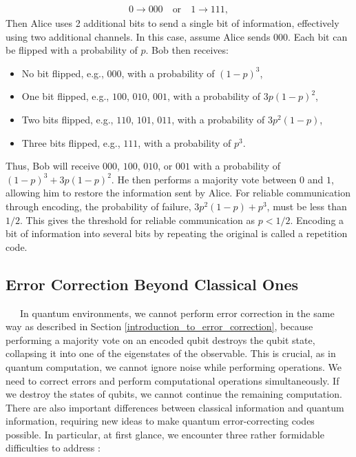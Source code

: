 \documentclass[a4paper,11pt]{ltjsarticle}
\begin{document}
{{        \begin{align}
            0 \rightarrow 000 \quad \text{or} \quad 1 \rightarrow 111,
        \end{align}      
        Then Alice uses 2 additional bits to send a single bit of information, effectively using two additional channels. In this case, assume Alice sends $000$. Each bit can be flipped with a probability of $p$. Bob then receives:
        \begin{itemize}
            \item No bit flipped, e.g., $000$, with a probability of $(1-p)^3$,
            \item One bit flipped, e.g., $100$, $010$, $001$, with a probability of $3p(1-p)^2$,
            \item Two bits flipped, e.g., $110$, $101$, $011$, with a probability of $3p^2(1-p)$,
            \item Three bits flipped, e.g., $111$, with a probability of $p^3$.
        \end{itemize}
        Thus, Bob will receive $000$, $100$, $010$, or $001$ with a probability of $(1-p)^3 + 3p(1-p)^2$. He then performs a majority vote between $0$ and $1$, allowing him to restore the information sent by Alice. For reliable communication through encoding, the probability of failure, $3p^2(1-p) + p^3$, must be less than $1/2$. This gives the threshold for reliable communication as $p < 1/2$. Encoding a bit of information into several bits by repeating the original is called a repetition code.

        \subsection{Error Correction Beyond Classical Ones}\label{repetition_code}{
            \ \ \ In quantum environments, we cannot perform error correction in the same way as described in Section \ref{introduction_to_error_correction}, because performing a majority vote on an encoded qubit destroys the qubit state, collapsing it into one of the eigenstates of the observable. This is crucial, as in quantum computation, we cannot ignore noise while performing operations. We need to correct errors and perform computational operations simultaneously. If we destroy the states of qubits, we cannot continue the remaining computation. There are also important differences between classical information and quantum information, requiring new ideas to make quantum error-correcting codes possible. In particular, at first glance, we encounter three rather formidable difficulties to address \cite{nielsen2010}:

}}}
\end{document}
